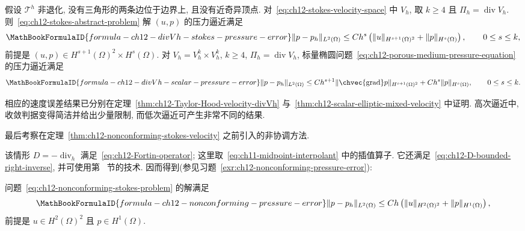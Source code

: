 \begin{Theorem}
\label{thm:ch12-divVh-pressure-errors}
假设 $\mathcal T^h$ 非退化, 没有三角形的两条边位于边界上, 且没有近奇异顶点. 对~\eqref{eq:ch12-stokes-velocity-space} 中 $V_h$, 取 $k\geq4$ 且 $\Pi_h=\operatorname{div}V_h$. 则~\eqref{eq:ch12-stokes-abstract-problem} 解 $(u,p)$ 的压力逼近满足
\[
\MathBookFormulaID{formula-ch12-divVh-stokes-pressure-error}
\|p-p_h\|_{L^2(\Omega)}
\leq Ch^s\left(\|u\|_{H^{s+1}(\Omega)^2}
+\|p\|_{H^s(\Omega)}\right),\qquad0\leq s\leq k,
\]
前提是 $(u,p)\in H^{s+1}(\Omega)^2\times H^s(\Omega)$. 对 $V_h=V_h^k\times V_h^k$, $k\geq4$, $\Pi_h=\operatorname{div}V_h$, 标量椭圆问题~\eqref{eq:ch12-porous-medium-pressure-equation} 的压力逼近满足
\[
\MathBookFormulaID{formula-ch12-divVh-scalar-pressure-error}
\|p-p_h\|_{L^2(\Omega)}
\leq Ch^{s+1}\|\chvec{\operatorname{grad}}p\|_{H^{s+1}(\Omega)^2}
+Ch^s\|p\|_{H^s(\Omega)},\qquad0\leq s\leq k.
\]
\end{Theorem}

相应的速度误差结果已分别在定理~\ref{thm:ch12-Taylor-Hood-velocity-divVh} 与~\ref{thm:ch12-scalar-elliptic-mixed-velocity} 中证明. 高次逼近中, 收敛判据变得简洁并给出少量限制, 而低次逼近可产生非常不同的结果.

最后考察在定理~\ref{thm:ch12-nonconforming-stokes-velocity} 之前引入的非协调方法.

该情形 $D=-\operatorname{div}_h$ 满足~\eqref{eq:ch12-Fortin-operator}; 这里取~\eqref{eq:ch11-midpoint-interpolant} 中的插值算子. 它还满足~\eqref{eq:ch12-D-bounded-right-inverse}, 并可使用第~ 节的技术. 因而得到(参见习题~\ref{exr:ch12-nonconforming-pressure-error}):

\begin{Theorem}
\label{thm:ch12-nonconforming-pressure-error}
问题~\eqref{eq:ch12-nonconforming-stokes-problem} 的解满足
\[
\MathBookFormulaID{formula-ch12-nonconforming-pressure-error}
\|p-p_h\|_{L^2(\Omega)}
\leq Ch\left(\|u\|_{H^2(\Omega)^2}
+\|p\|_{H^1(\Omega)}\right),
\]
前提是 $u\in H^2(\Omega)^2$ 且 $p\in H^1(\Omega)$.
\end{Theorem}

